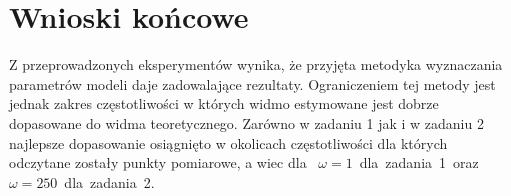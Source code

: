 \documentclass[a4paper,15pt]{article}
\begin{document}
\section{Wnioski końcowe}
Z przeprowadzonych eksperymentów wynika, że przyjęta metodyka wyznaczania parametrów modeli daje zadowalające rezultaty. Ograniczeniem tej metody jest jednak zakres częstotliwości w których widmo estymowane jest dobrze dopasowane do widma teoretycznego. Zarówno w zadaniu 1 jak i w zadaniu 2 najlepsze dopasowanie osiągnięto w okolicach częstotliwości dla których odczytane zostały punkty pomiarowe, a wiec dla \mbox{ \( \omega = 1 \) dla zadania 1 oraz \( \omega = 250 \) dla zadania  2.} 

 
\end{document}
